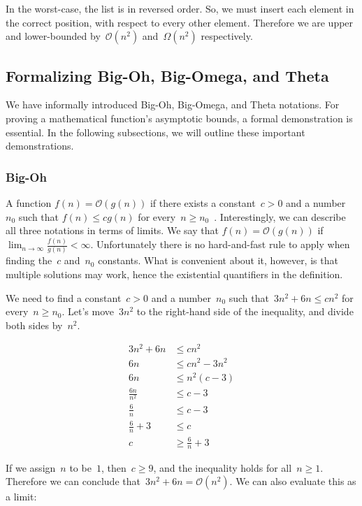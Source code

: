 In the worst-case, the list is in reversed order. 
So, we must insert each element in the correct position, with respect to every other element. 
Therefore we are upper and lower-bounded by~$\mathcal{O}(n^2)$ and~$\Omega(n^2)$ respectively.

\subsection{Formalizing Big-Oh, Big-Omega, and Theta}
We have informally introduced Big-Oh, Big-Omega, and Theta notations. 
For proving a mathematical function's asymptotic bounds, a formal demonstration is essential. 
In the following subsections, we will outline these important demonstrations.

\subsubsection*{Big-Oh}
A function $f(n) = \mathcal{O}(g(n))$ if there exists a constant~$c > 0$ and a number~$n_0$ such that $f(n) \leq cg(n)$ for every~$n \geq n_0$~. 
Interestingly, we can describe all three notations in terms of limits. 
We say that $f(n) = \mathcal{O}(g(n))$ if $\lim_{n \to \infty} \frac{f(n)}{g(n)} < \infty$. 
Unfortunately there is no hard-and-fast rule to apply when finding the~$c$ and~$n_0$ constants. 
What is convenient about it, however, is that multiple solutions may work, hence the existential quantifiers in the definition.

We need to find a constant~$c > 0$ and a number~$n_0$ such that~$3n^2 + 6n \leq cn^2$ for every~$n \geq n_0$. 
Let's move~$3n^2$ to the right-hand side of the inequality, and divide both sides by~$n^2$.

\begin{align*}
  3n^2 + 6n &\leq cn^2\\
  6n &\leq cn^2 - 3n^2\\
  6n &\leq n^2(c - 3)\\
  \frac{6n}{n^2} &\leq c - 3\\
  \frac{6}{n} &\leq c - 3\\
  \frac{6}{n} + 3 &\leq c\\
  c &\geq \frac{6}{n} + 3
\end{align*}

If we assign~$n$ to be~$1$, then~$c \geq 9$, and the inequality holds for all~$n \geq 1$. Therefore we can conclude that~$3n^2 + 6n = \mathcal{O}(n^2)$. We can also evaluate this as a limit:

